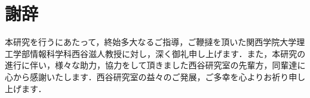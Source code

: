 \chapter{謝辞}\label{ux8b1dux8f9e}

本研究を行うにあたって，終始多大なるご指導，ご鞭撻を頂いた関西学院大学理工学部情報科学科西谷滋人教授に対し，深く御礼申し上げます．また，本研究の進行に伴い，様々な助力，協力をして頂きました西谷研究室の先輩方，同輩達に心から感謝いたします．西谷研究室の益々のご発展，ご多幸を心よりお祈り申し上げます．

    